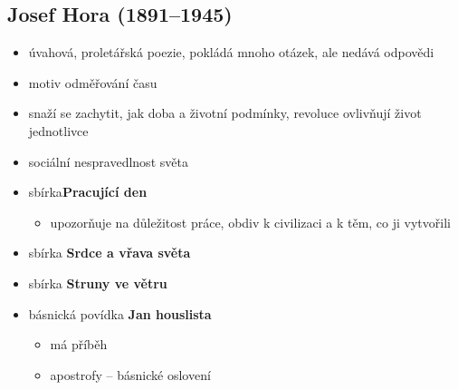 \subsection{Josef Hora (1891--1945)}
\begin{itemize}
\item úvahová, proletářská poezie, pokládá mnoho otázek, ale nedává odpovědi
\item motiv odměřování času
\item snaží se zachytit, jak doba a životní podmínky, revoluce ovlivňují život jednotlivce
\item sociální nespravedlnost světa
\item sbírka\textbf{Pracující den}
	\begin{itemize}
	\item upozorňuje na důležitost práce, obdiv k civilizaci a k těm, co ji vytvořili
	\end{itemize}
\item sbírka \textbf{Srdce a vřava světa}
\item sbírka \textbf{Struny ve větru}
\item básnická povídka \textbf{Jan houslista}
	\begin{itemize}
	\item má příběh
	\item apostrofy -- básnické oslovení
	\end{itemize}
\end{itemize}

